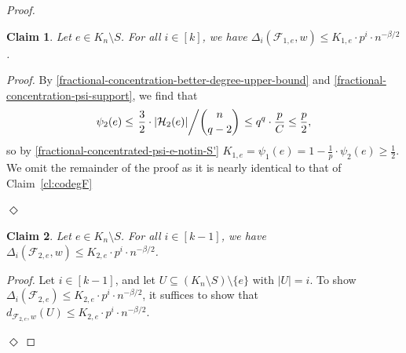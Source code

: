 \documentclass[11pt]{article}
\def\COMMENT#1{}
\numberwithin{equation}{section}
\newcommand{\mc}[1]{\mathcal{#1}}
\newcounter{i}
\theoremstyle{plain}
\newtheorem{claim}{Claim}[thm]
\newenvironment{proofclaim}[1][]%
{\noindent \emph{Proof.} {}{#1}{}}{\hfill
	$\Diamond$\vspace{1em}}
\theoremstyle{plain} %
\theoremstyle{definition}
\newcommand{\cF}{\mathcal{F}}
\newcommand{\cH}{\mathcal{H}}
\begin{document}
\begin{proof}
\begin{claim}\label{cl:codegF1}
Let $e \in K_n \setminus S$.  For all $i\in [k]$, we have $\Delta_{i}(\cF_{1,e}, w)\le K_{1,e}\cdot p^i\cdot n^{-\beta/2}$.%
\end{claim}
\begin{proofclaim}
By \ref{fractional-concentration-better-degree-upper-bound} and \eqref{fractional-concentration-psi-support}, we find that 
$$\psi_2(e) \le \left.\frac{3}{2}\cdot |\mc{H}_2(e)|\middle/{\binom{n}{q-2}}\right. \le q^q\cdot \frac{p}{C} \leq \frac{p}{2},$$ 
so by \eqref{fractional-concentrated-psi-e-notin-S'} $K_{1,e} = \psi_1(e) = 1 - \frac{1}{p}\cdot \psi_2(e) \ge \frac{1}{2}$.
We omit the remainder of the proof as it is nearly identical to that of Claim~\ref{cl:codegF} 
\COMMENT{
Let $i\in [k]$, and let $U\subseteq (K_n\setminus S)\setminus \{e\}$ with $|U|=i$. To show $\Delta_i(\cF_{1,e}, w) \leq K_{1,e}\cdot p^i \cdot n^{-\beta/2}$, it suffices to show that $d_{\cF_{1,e}, w}(U) \le p^i\cdot n^{-\beta/2} / 2$ since $K_{1,e} \geq 1/2$.\\
\indent Let $U':= U\cup \{e\}$.  By \eqref{fractional-concentration-psi-support} and \ref{fractional-concentration-easy-degree-upper-bound}, we have
$$d_{\cF_{1,e},w}(U) = \sum_{Z\in \mc{H}_1(V(U'))} \psi(V(Z)) \leq \left.\frac{3}{2}|\cH_2(V(U'))|\middle/\binom{n}{q - 2}\right. \leq q^q\cdot n^{2 - v(U')}.$$
Furthermore, by \ref{fractional-concentration-2-density}, $i=e(U')-1\le (v(U')-2)\cdot (q+1) / 2$. Hence,
$$p^i \ge \frac{n^{\beta\cdot i}}{n^{i\cdot 2/(q+1)}} \geq \frac{n^{\beta\cdot i}}{n^{v(U')-2}} \ge 2 \cdot d_{\cF_{1,e},w}(U) \cdot n^{\beta/2},$$
as desired where we used that $n$ is large enough and $i\ge 1$.\\ 
}
\end{proofclaim}



\begin{claim}\label{cl:codegF2}
Let $e \in K_n\setminus S$.  For all $i\in [k-1]$, we have $\Delta_{i}(\cF_{2,e}, w)\le K_{2,e}\cdot p^i\cdot n^{-\beta/2}$.%
\end{claim}
\begin{proofclaim}
Let $i\in [k-1]$, and let $U\subseteq (K_n\setminus S)\setminus \{e\}$ with $|U|=i$. To show $\Delta_i(\cF_{2,e}) \leq K_{2,e}\cdot p^i\cdot n^{-\beta / 2}$, it suffices to show that $d_{\cF_{2,e},w}(U) \le K_{2,e}\cdot p^i\cdot n^{-\beta/2}$.


\end{proofclaim}
\end{proof}
\end{document}
